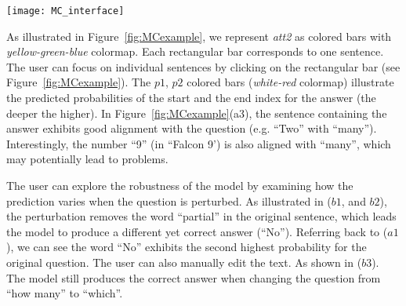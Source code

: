 \begin{figure*}[t]
\centering
\vspace{-2mm}
 \texttt{[image: MC\_interface]}
  \vspace{-7mm}
 \caption{
In the machine comprehension visualization interface (a), the $p1$, $p2$ colored bar (in $a3$) illustrates the predicted start and end index of the answer in the context (the deeper the red, the higher the probability). The most likely answer is shown in ($a1$). The global and local attention are visualized by ($a2$, $a3$).
%
We can evaluate the robustness of the prediction by perturbing the question sentence ($b1$, $b3$). As illustrated in ($b1$, $b2$) by removing the word ``partial'', the model still finds the correct answer (albeit different, as the sentence perturbation changes the exact meaning of the question). 
}
\label{fig:MCexample}
\end{figure*}

As illustrated in Figure~\ref{fig:MCexample}, we represent \emph{att2} as colored bars with \emph{yellow-green-blue} colormap. Each rectangular bar corresponds to one sentence. The user can focus on individual sentences by clicking on the rectangular bar (see Figure~\ref{fig:MCexample}).
The $p1$, $p2$ colored bars (\emph{white-red} colormap) illustrate the predicted probabilities of the start and the end index for the answer (the deeper the higher). %
%
In Figure~\ref{fig:MCexample}(a3), the sentence containing the answer exhibits good alignment with the question (e.g. ``Two'' with ``many'').
Interestingly, the number ``9'' (in ``Falcon 9') is also aligned with ``many'', which may potentially lead to problems.

The user can explore the robustness of the model by examining how the prediction varies when the question is perturbed.
%
As illustrated in ($b1$, and $b2$), the perturbation removes the word ``partial'' in the original sentence, which leads the model to produce a different yet correct answer (``No''). Referring back to ($a1$), we can see the word ``No'' exhibits the second highest probability for the original question.
%
The user can also manually edit the text. As shown in ($b3$). The model still produces the correct answer when changing the question from ``how many'' to ``which''.
